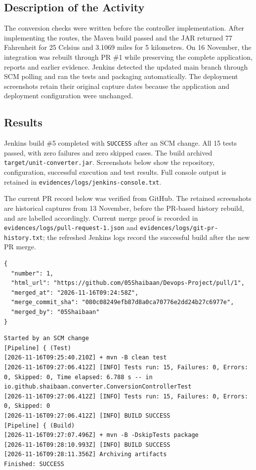 \documentclass[12pt,a4paper]{article}
\begin{document}
\subsection*{Description of the Activity}

The conversion checks were written before the controller implementation. After implementing the routes, the Maven build passed and the JAR returned 77 Fahrenheit for 25 Celsius and 3.1069 miles for 5 kilometres. On 16 November, the integration was rebuilt through PR \#1 while preserving the complete application, reports and earlier evidence. Jenkins detected the updated main branch through SCM polling and ran the tests and packaging automatically. The deployment screenshots retain their original capture dates because the application and deployment configuration were unchanged.

\subsection*{Results}

Jenkins build \#5 completed with \texttt{SUCCESS} after an SCM change. All 15 tests passed, with zero failures and zero skipped cases. The build archived \texttt{target/unit-converter.jar}. Screenshots below show the repository, configuration, successful execution and test results. Full console output is retained in \texttt{evidences/logs/jenkins-console.txt}.

The current PR record below was verified from GitHub. The retained screenshots are historical captures from 13 November, before the PR-based history rebuild, and are labelled accordingly. Current merge proof is recorded in \texttt{evidences/logs/pull-request-1.json} and \texttt{evidences/logs/git-pr-history.txt}; the refreshed Jenkins logs record the successful build after the new PR merge.

\begin{lstlisting}
{
  "number": 1,
  "html_url": "https://github.com/05Shaibaan/Devops-Project/pull/1",
  "merged_at": "2026-11-16T09:24:58Z",
  "merge_commit_sha": "080c08249efb87d8a0ca70776e2dd24b27c6977e",
  "merged_by": "05Shaibaan"
}
\end{lstlisting}

\begin{lstlisting}
Started by an SCM change
[Pipeline] { (Test)
[2026-11-16T09:25:40.210Z] + mvn -B clean test
[2026-11-16T09:27:06.412Z] [INFO] Tests run: 15, Failures: 0, Errors: 0, Skipped: 0, Time elapsed: 6.788 s -- in io.github.shaibaan.converter.ConversionControllerTest
[2026-11-16T09:27:06.412Z] [INFO] Tests run: 15, Failures: 0, Errors: 0, Skipped: 0
[2026-11-16T09:27:06.412Z] [INFO] BUILD SUCCESS
[Pipeline] { (Build)
[2026-11-16T09:27:07.496Z] + mvn -B -DskipTests package
[2026-11-16T09:28:10.993Z] [INFO] BUILD SUCCESS
[2026-11-16T09:28:11.356Z] Archiving artifacts
Finished: SUCCESS
\end{lstlisting}
\end{document}
